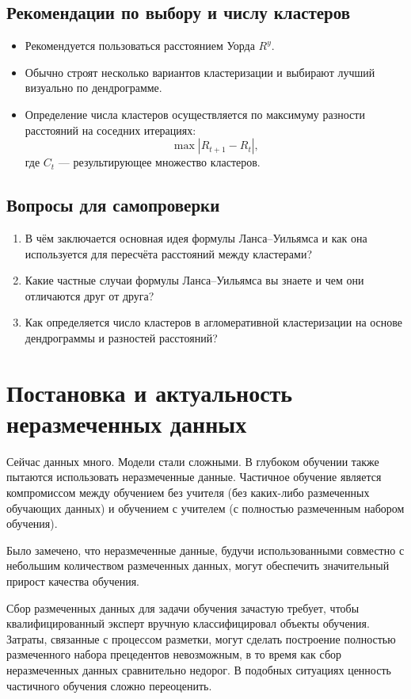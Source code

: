 \subsection{Рекомендации по выбору и числу кластеров}
\begin{itemize}
    \item Рекомендуется пользоваться расстоянием Уорда $R^{y}$.
    \item Обычно строят несколько вариантов кластеризации и выбирают лучший визуально по дендрограмме.
    \item Определение числа кластеров осуществляется по максимуму разности расстояний на соседних итерациях:
    \[
    \max |R_{t+1} - R_t|,
    \]
    где $C_t$ — результирующее множество кластеров.
\end{itemize}


\subsection*{Вопросы для самопроверки}
\begin{enumerate}
    \item В чём заключается основная идея формулы Ланса–Уильямса и как она используется для пересчёта расстояний между кластерами?
    \item Какие частные случаи формулы Ланса–Уильямса вы знаете и чем они отличаются друг от друга?
    \item Как определяется число кластеров в агломеративной кластеризации на основе дендрограммы и разностей расстояний?
\end{enumerate}

\section*{Постановка и актуальность неразмеченных данных}
Сейчас данных много. Модели стали сложными. В глубоком обучении также пытаются использовать неразмеченные данные. Частичное обучение является компромиссом между обучением без учителя (без каких-либо размеченных обучающих данных) и обучением с учителем (с полностью размеченным набором обучения). \par 
Было замечено, что неразмеченные данные, будучи использованными совместно с небольшим количеством размеченных данных, могут обеспечить значительный прирост качества обучения. \par 
Сбор размеченных данных для задачи обучения зачастую требует, чтобы квалифицированный эксперт вручную классифицировал объекты обучения. Затраты, связанные с процессом разметки, могут сделать построение полностью размеченного набора прецедентов невозможным, в то время как сбор неразмеченных данных сравнительно недорог. В подобных ситуациях ценность частичного обучения сложно переоценить.

